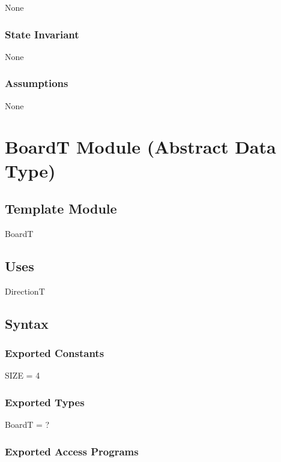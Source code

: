 \documentclass[12pt]{article}
\begin{document}
None

\subsubsection* {State Invariant}

None

\subsubsection* {Assumptions}

None

\newpage

\section* {BoardT Module (Abstract Data Type)}

\subsection*{Template Module}

BoardT

\subsection* {Uses}

DirectionT

\subsection* {Syntax}

\subsubsection* {Exported Constants}

SIZE = 4

\subsubsection* {Exported Types}

BoardT = ?

\subsubsection* {Exported Access Programs}
\end{document}
